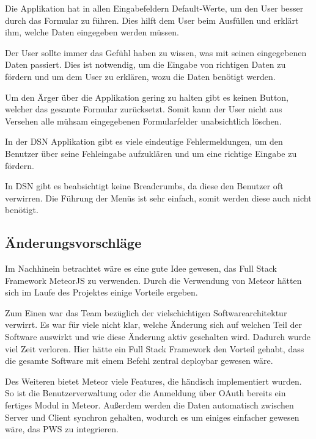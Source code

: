 Die Applikation hat in allen Eingabefeldern Default-Werte, um den User besser durch das Formular zu führen. Dies hilft dem User beim Ausfüllen und erklärt ihm, welche Daten eingegeben werden müssen.

Der User sollte immer das Gefühl haben zu wissen, was mit seinen eingegebenen Daten passiert. Dies ist notwendig, um die Eingabe von richtigen Daten zu fördern und um dem User zu erklären, wozu die Daten benötigt werden.

Um den Ärger über die Applikation gering zu halten gibt es keinen Button, welcher das gesamte Formular zurücksetzt. Somit kann der User nicht aus Versehen alle mühsam eingegebenen Formularfelder unabsichtlich löschen.

In der DSN Applikation gibt es viele eindeutige Fehlermeldungen, um den Benutzer über seine Fehleingabe aufzuklären und um eine richtige Eingabe zu fördern.

In DSN gibt es beabsichtigt keine Breadcrumbs, da diese den Benutzer oft verwirren. Die Führung der Menüs ist sehr einfach, somit werden diese auch nicht benötigt.

\subsection{Änderungsvorschläge}
Im Nachhinein betrachtet wäre es eine gute Idee gewesen, das Full Stack Framework MeteorJS zu verwenden. Durch die Verwendung von Meteor hätten sich im Laufe des Projektes einige Vorteile ergeben. 

Zum Einen war das Team bezüglich der vielschichtigen Softwarearchitektur verwirrt. Es war für viele nicht klar, welche Änderung sich auf welchen Teil der Software auswirkt und wie diese Änderung aktiv geschalten wird. Dadurch wurde viel Zeit verloren. Hier hätte ein Full Stack Framework den Vorteil gehabt, dass die gesamte Software mit einem Befehl zentral deploybar gewesen wäre. 

Des Weiteren bietet Meteor viele Features, die händisch implementiert wurden. So ist die Benutzerverwaltung oder die Anmeldung über OAuth bereits ein fertiges Modul in Meteor. Außerdem werden die Daten automatisch zwischen Server und Client synchron gehalten, wodurch es um einiges einfacher gewesen wäre, das PWS zu integrieren.